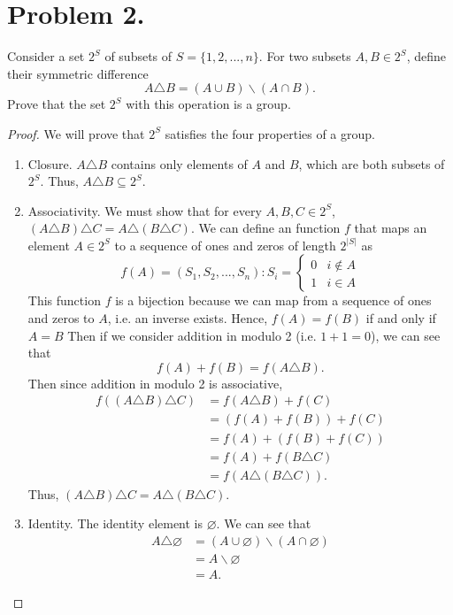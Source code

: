 \documentclass{article}
\begin{document}
\section{Problem 2.}
\label{Problem 2.}
Consider a set $2^S$ of subsets of $S=\{1,2,...,n\}$. For two subsets $A,B\in 2^S$, define their symmetric difference 
\[A\triangle B=(A\cup B)\backslash(A\cap B).\]
Prove that the set $2^S$ with this operation is a group.
\begin{proof}
We will prove that $2^S$ satisfies the four properties of a group.
\begin{enumerate}[label=(\arabic*)]
    \item Closure. $A\triangle B$ contains only elements of $A$ and $B$, which are both subsets of $2^S$. Thus, $A\triangle B \subseteq 2^S$. 
    \item Associativity. We must show that for every $A,B,C\in 2^S$, $(A\triangle B)\triangle C=A\triangle(B\triangle C)$. We can define an function $f$ that maps an element $A\in 2^S$ to a sequence of ones and zeros of length $2^{|S|}$ as
    \[f(A)=(S_1,S_2,...,S_n):S_i=
    \begin{cases}
    0 & i \notin A\\
    1 & i \in A
    \end{cases}\]
    This function $f$ is a bijection because we can map from a sequence of ones and zeros to $A$, i.e. an inverse exists. Hence, $f(A)=f(B)$ if and only if $A=B$ Then if we consider addition in modulo 2 (i.e. $1+1=0$), we can see that 
    \[f(A)+f(B)=f(A\triangle B).\]
    Then since addition in modulo 2 is associative,
    \begin{align*}
        f((A\triangle B)\triangle C)&=f(A\triangle B)+f(C)\\
        &=(f(A)+f(B))+f(C)\\
        &=f(A)+(f(B)+f(C))\\
        &=f(A)+f(B\triangle C)\\
        &=f(A\triangle (B\triangle C)).
    \end{align*}
    Thus, $(A\triangle B)\triangle C=A\triangle(B\triangle C)$.
    \item Identity. The identity element is $\varnothing$. We can see that
    \begin{align*}
        A\triangle\varnothing&=(A\cup\varnothing)\backslash(A\cap\varnothing)\\
        &=A\backslash\varnothing\\
        &=A.
    \end{align*}

\end{enumerate}
\end{proof}
\end{document}
